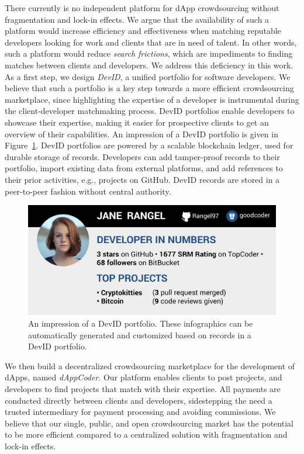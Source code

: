 There currently is no independent platform for dApp crowdsourcing without fragmentation and lock-in effects.
We argue that the availability of such a platform would increase efficiency and effectiveness when matching reputable developers looking for work and clients that are in need of talent.
In other words, such a platform would reduce \emph{search frictions}, which are impediments to finding matches between clients and developers.
We address this deficiency in this work.
As a first step, we design \emph{DevID}, a unified portfolio for software developers.
We believe that such a portfolio is a key step towards a more efficient crowdsourcing marketplace, since highlighting the expertise of a developer is instrumental during the client-developer matchmaking process.
DevID portfolios enable developers to showcase their expertise, making it easier for prospective clients to get an overview of their capabilities.
An impression of a DevID portfolio is given in Figure~\ref{fig:devid}.
DevID portfolios are powered by a scalable blockchain ledger, used for durable storage of records.
Developers can add tamper-proof records to their portfolio, import existing data from external platforms, and add references to their prior activities, e.g., projects on GitHub.
DevID records are stored in a peer-to-peer fashion without central authority.

\begin{figure}[t]
	\includegraphics[width=\columnwidth]{devid/resources/devid_smaller.jpeg}
	\caption{An impression of a DevID portfolio. These infographics can be automatically generated and customized based on records in a DevID portfolio.}
	\label{fig:devid}
\end{figure}

We then build a decentralized crowdsourcing marketplace for the development of dApps, named \emph{dAppCoder}.
Our platform enables clients to post projects, and developers to find projects that match with their expertise.
All payments are conducted directly between clients and developers, sidestepping the need a trusted intermediary for payment processing and avoiding commissions.
We believe that our single, public, and open crowdsourcing market has the potential to be more efficient compared to a centralized solution with fragmentation and lock-in effects.

